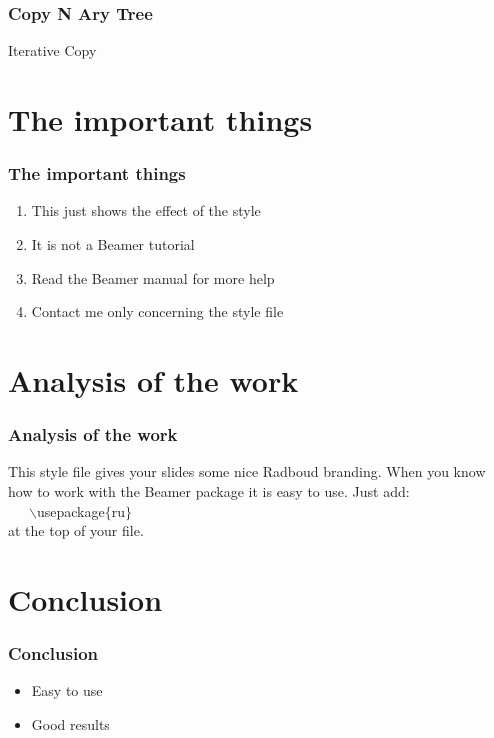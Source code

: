 \documentclass{beamer}
\begin{document}
\begin{frame}
	\frametitle{Copy N Ary Tree}
	\begin{block}{Iterative Copy}
		\begin{algorithmic}[1]
				\State {}
			\EndProcedure
		\end{algorithmic}
	\end{block}
\end{frame}
\section{The important things}

\begin{frame}
	\frametitle{The important things}

	\begin{enumerate}
	        \item This just shows the effect of the style
		\item It is not a Beamer tutorial
		\item Read the Beamer manual for more help
		\item Contact me only concerning the style file
	\end{enumerate}
\end{frame}

\section{Analysis of the work}

\begin{frame}
	  \frametitle{Analysis of the work}

	    This style file gives your slides some nice Radboud branding.
	    When you know how to work with the Beamer package it is easy to use.
	    Just add:\\ ~~~$\backslash$usepackage$\{$ru$\}$ \\ at the top of your file.
\end{frame}

\section{Conclusion}

\begin{frame}
	  \frametitle{Conclusion}

	  \begin{itemize}
	  	\item Easy to use
		\item Good results
	  \end{itemize}
\end{frame}
\end{document}
